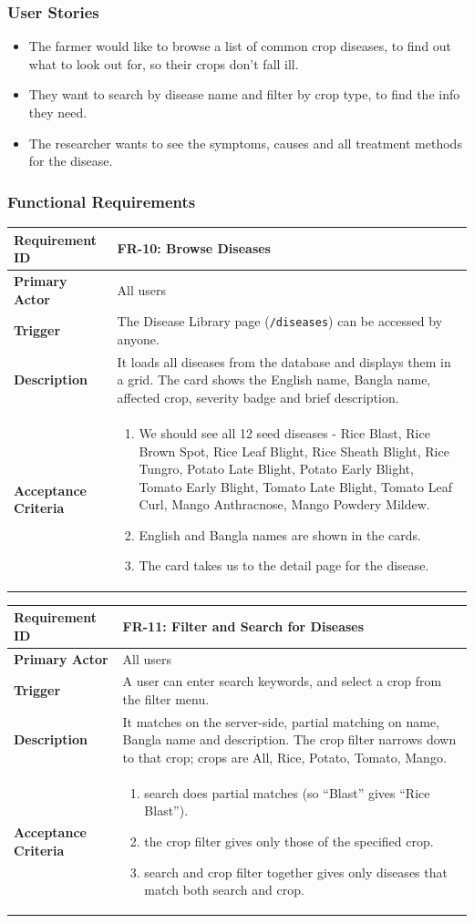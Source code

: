 \documentclass[12pt,a4paper]{article}
\newcommand{\frbox}[5]{%
  \begin{table}[H]
  \centering
  \begin{tabularx}{\textwidth}{|l|X|}
  \hline
  \rowcolor{lightgreen}
  \textbf{Requirement ID} & \textbf{#1} \\
  \hline
  \textbf{Primary Actor} & #2 \\
  \hline
  \textbf{Trigger} & #3 \\
  \hline
  \textbf{Description} & #4 \\
  \hline
  \rowcolor{lightgreen}
  \textbf{Acceptance Criteria} & #5 \\
  \hline
  \end{tabularx}
  \end{table}
}
\begin{document}
\subsubsection*{User Stories}

\begin{itemize}[leftmargin=2em]
  \item The farmer would like to browse a list of common crop diseases, to find out what to look out for, so their crops don't fall ill.
  \item They want to search by disease name and filter by crop type, to find the info they need.
  \item The researcher wants to see the symptoms, causes and all treatment methods for the disease.
\end{itemize}

\subsubsection*{Functional Requirements}

\frbox{FR-10: Browse Diseases}
{All users}
{The Disease Library page (\texttt{/diseases}) can be accessed by anyone.}
{It loads all diseases from the database and displays them in a grid. The card shows the English name, Bangla name, affected crop, severity badge and brief description.}
{%
\begin{enumerate}[leftmargin=1.5em, topsep=0pt]
  \item We should see all 12 seed diseases - Rice Blast, Rice Brown Spot, Rice Leaf Blight, Rice Sheath Blight, Rice Tungro, Potato Late Blight, Potato Early Blight, Tomato Early Blight, Tomato Late Blight, Tomato Leaf Curl, Mango Anthracnose, Mango Powdery Mildew.
  \item English and Bangla names are shown in the cards.
  \item The card takes us to the detail page for the disease.
\end{enumerate}
}

\frbox{FR-11: Filter and Search for Diseases}
{All users}
{A user can enter search keywords, and select a crop from the filter menu.}
{It matches on the server-side, partial matching on name, Bangla name and description. The crop filter narrows down to that crop; crops are All, Rice, Potato, Tomato, Mango.}
{%
\begin{enumerate}[leftmargin=1.5em, topsep=0pt]
  \item search does partial matches (so ``Blast'' gives ``Rice Blast'').
  \item the crop filter gives only those of the specified crop.
  \item search and crop filter together gives only diseases that match both search and crop.
\end{enumerate}
}
\end{document}
